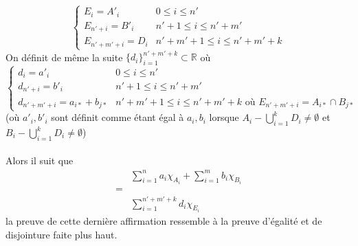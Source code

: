 \documentclass[a4paper,10pt]{article}
\begin{document}
$$
\begin{cases}
	E_i = A'_i & 0 \leq i \leq n' \\
	E_{n' + i} = B'_i & n' + 1\leq i \leq n' + m' \\
	E_{n' + m' + i} = D_i & n' + m' + 1 \leq i \leq n'+m'+k
\end{cases}
$$
On définit de même la suite $\{d_i\}_{i=1}^{n'+m'+k} \subset \mathbb{R}$  où
$$
\begin{cases}
	d_i = a'_i & 0 \leq i \leq n' \\
	d_{n' + i} = b'_i & n' + 1\leq i \leq n' + m' \\
	d_{n' + m' + i} = a_{i*} + b_{j*} & n' + m' + 1 \leq i \leq n'+m'+k \text{ où } E_{n' + m' + i} = A_{i*} \cap B_{j*}
\end{cases}
$$
(où $a'_i, b'_i$ sont définit comme étant égal à $a_i, b_i$ lorsque $A_i - \bigcup_{i=1}^k D_i \not = \emptyset$ et $B_i - \bigcup_{i=1}^k D_i \not = \emptyset$)
\\
\\
Alors il suit que 
\begin{align*}
	& \sum_{i=1}^n a_i \chi_{A_i} + \sum_{i = 1}^m b_i \chi_{B_i} \\
	= \\
	& \sum_{i=1}^{n' + m' + k} d_i \chi_{E_i}
\end{align*}
la preuve de cette dernière affirmation ressemble à la preuve d'égalité et de disjointure faite plus haut.
\end{document}
